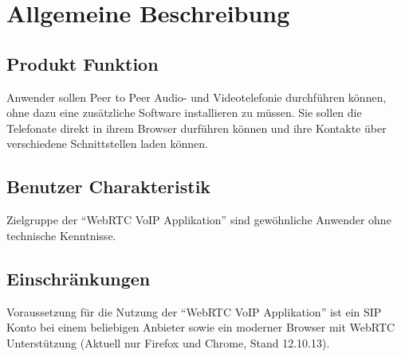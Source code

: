 \chapter{Allgemeine Beschreibung}
\label{requirements} 


\section{Produkt Funktion}
Anwender sollen Peer to Peer Audio- und Videotelefonie durchführen können, ohne dazu eine zusätzliche Software installieren zu müssen. Sie sollen die Telefonate direkt in ihrem Browser durführen können und ihre Kontakte über verschiedene Schnittstellen laden können.

\section{Benutzer Charakteristik}
Zielgruppe der ``WebRTC VoIP Applikation'' sind gewöhnliche Anwender ohne technische Kenntnisse.

\section{Einschränkungen}
Voraussetzung für die Nutzung der ``WebRTC VoIP Applikation'' ist ein SIP Konto bei einem beliebigen Anbieter sowie ein moderner Browser mit WebRTC Unterstützung (Aktuell nur Firefox und Chrome, Stand 12.10.13).


